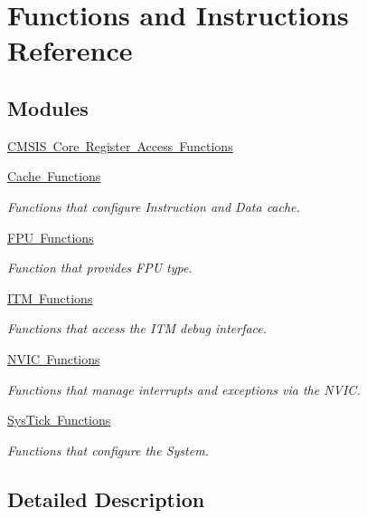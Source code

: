 \hypertarget{group__CMSIS__Core__FunctionInterface}{}\section{Functions and Instructions Reference}
\label{group__CMSIS__Core__FunctionInterface}
\subsection*{Modules}
\begin{DoxyCompactItemize}
\item 
\mbox{\hyperlink{group__CMSIS__Core__RegAccFunctions}{C\+M\+S\+I\+S Core Register Access Functions}}
\item 
\mbox{\hyperlink{group__CMSIS__Core__CacheFunctions}{Cache Functions}}
\begin{DoxyCompactList}\small\item\em Functions that configure Instruction and Data cache. \end{DoxyCompactList}\item 
\mbox{\hyperlink{group__CMSIS__Core__FpuFunctions}{F\+P\+U Functions}}
\begin{DoxyCompactList}\small\item\em Function that provides F\+PU type. \end{DoxyCompactList}\item 
\mbox{\hyperlink{group__CMSIS__core__DebugFunctions}{I\+T\+M Functions}}
\begin{DoxyCompactList}\small\item\em Functions that access the I\+TM debug interface. \end{DoxyCompactList}\item 
\mbox{\hyperlink{group__CMSIS__Core__NVICFunctions}{N\+V\+I\+C Functions}}
\begin{DoxyCompactList}\small\item\em Functions that manage interrupts and exceptions via the N\+V\+IC. \end{DoxyCompactList}\item 
\mbox{\hyperlink{group__CMSIS__Core__SysTickFunctions}{Sys\+Tick Functions}}
\begin{DoxyCompactList}\small\item\em Functions that configure the System. \end{DoxyCompactList}\end{DoxyCompactItemize}


\subsection{Detailed Description}
